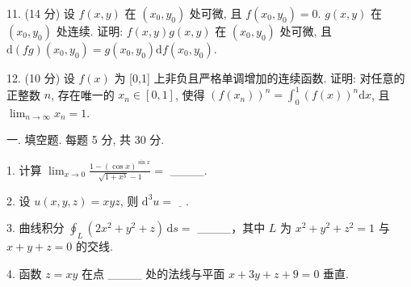 \documentclass{examcollection}
\begin{document}
{\begin{minipage}{\textwidth}
11. (14 分) 设 $f(x, y)$ 在 $(x_0, y_0)$ 处可微, 且 $f(x_0, y_0) = 0$. $g(x, y)$ 在 $(x_0, y_0)$ 处连续. 证明: $f(x, y)g(x, y)$ 在 $(x_0, y_0)$ 处可微, 且 $\mathrm{d}(fg)(x_0, y_0) = g(x_0, y_0)\mathrm{d}f(x_0, y_0)$.\par
12. (10 分) 设 $f(x)$ 为 [0,1] 上非负且严格单调增加的连续函数. 证明: 对任意的正整数 $n$, 存在唯一的 $x_{n} \in [0,1]$, 使得 $(f(x_{n}))^{n} = \int_{0}^{1}(f(x))^{n}\mathrm{d}x$, 且 $\lim_{n\to \infty}x_n = 1$.\par
{}\smallskip
一. 填空题. 每题 5 分, 共 30 分.\par
1. 计算 $\lim_{x\to 0}\frac{1 - (\cos x)^{\sin x}}{\sqrt{1 + x^3} - 1} =$ \_\_\_\_.\par
2. 设 $u(x, y, z) = xyz$, 则 $\mathrm{d}^3 u = \underline{\quad}$.\par
3. 曲线积分 $\oint_{L} (2x^{2} + y^{2} + z) \, \mathrm{d}s =$ \_\_\_\_，其中 $L$ 为 $x^{2} + y^{2} + z^{2} = 1$ 与 $x + y + z = 0$ 的交线.\par
4. 函数 $z = xy$ 在点 \_\_\_\_ 处的法线与平面 $x + 3y + z + 9 = 0$ 垂直.\par
\end{minipage}}
\ifdim\dimexpr\ht\proofbox+\dp\proofbox\relax>\textheight
\noindent\resizebox{!}{\textheight}{\usebox{\proofbox}}\else\noindent\usebox{\proofbox}\fi\clearpage
\end{document}
